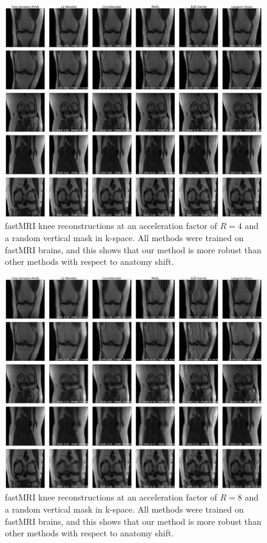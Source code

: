 \begin{figure}
    \centering
    \includegraphics[width=\columnwidth]{knee-random-vertical-R=4-comp.pdf}
    \caption{fastMRI knee reconstructions at an acceleration factor of $R=4$ and a random vertical mask in k-space. All methods were trained on fastMRI brains, and this shows that our method is more robust than other methods with respect to anatomy shift. 
    }
    \label{fig:knee-random-vertical-4}
\end{figure}

\begin{figure}
    \centering
    \includegraphics[width=\columnwidth]{knee-random-vertical-R=8-comp.pdf}
    \caption{fastMRI knee reconstructions at an acceleration factor of $R=8$ and a random vertical mask in k-space. All methods were trained on fastMRI brains, and this shows that our method is more robust than other methods with respect to anatomy shift.
    }
    \label{fig:knee-random-vertical-8}
\end{figure}


